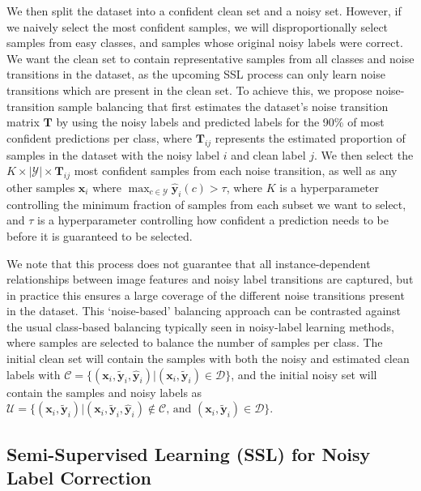 \documentclass[10pt,twocolumn,letterpaper]{article}
\begin{document}
We then split the dataset into a confident clean set and a noisy set. However, if we naively select the most confident samples, we will disproportionally select samples from easy classes, and samples whose original noisy labels were correct.
We want the clean set to contain representative samples from all classes and noise transitions in the dataset, as the upcoming SSL process can only learn noise transitions which are present in the clean set. 
To achieve this, we propose noise-transition sample balancing that
first estimates the dataset's noise transition matrix $\mathbf{T}$ by using the noisy labels and predicted labels for the 90\% of most confident predictions per class, where $\mathbf{T}_{ij}$ represents the estimated proportion of samples in the dataset with the noisy label $i$ and clean label $j$. 
We then select the $K \times |\mathcal{Y}| \times \mathbf{T}_{ij}$ most confident samples from each noise transition, as well as any other samples $\mathbf{x}_i$ where $\max_{c \in \mathcal{Y}} \hat{\mathbf{y}}_i(c) > \tau$, where $K$ is a hyperparameter controlling the minimum fraction of samples from each subset we want to select, and $\tau$ is a hyperparameter controlling how confident a prediction needs to be before it is guaranteed to be selected.


We note that this process does not guarantee that all instance-dependent relationships between image features and noisy label transitions are captured, but in practice this ensures a large coverage of the different noise transitions present in the dataset. This `noise-based' balancing approach can be contrasted against the usual class-based balancing typically seen in noisy-label learning methods, where samples are selected to balance the number of samples per class.
The initial clean set will contain the samples with both the noisy and estimated clean labels with $\mathcal{C} = \{(\mathbf{x}_i,\tilde{\mathbf{y}}_i,\hat{\mathbf{y}}_i) | (\mathbf{x}_i,\tilde{\mathbf{y}}_i) \in \mathcal{D}\}$, and the initial noisy set will contain the samples and noisy labels as $\mathcal{U}=\{ (\mathbf{x}_i,\tilde{\mathbf{y}}_i) |  (\mathbf{x}_i,\tilde{\mathbf{y}}_i,\hat{\mathbf{y}}_i) \notin \mathcal{C} \text{, and } (\mathbf{x}_i,\tilde{\mathbf{y}}_i) \in \mathcal{D}\}$. 


\subsection{Semi-Supervised Learning (SSL) for Noisy Label Correction}
\end{document}

